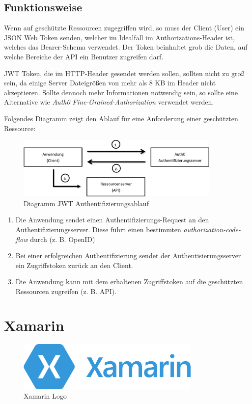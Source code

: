 \subsection{Funktionsweise}
Wenn auf geschützte Ressourcen zugegriffen wird, so muss der Client (User) ein JSON Web Token senden, 
welcher im Idealfall im Authorizations-Header ist, welches das Bearer-Schema verwendet. 
Der Token beinhaltet grob die Daten, auf welche Bereiche der API ein Benutzer zugreifen darf. 

JWT Token, die im HTTP-Header gesendet werden sollen, sollten nicht zu groß sein, da einige Server Dateigrößen von mehr als 8 KB im Header nicht akzeptieren.
Sollte dennoch mehr Informationen notwendig sein, so sollte eine Alternative wie \textit{Auth0 Fine-Grained-Authorization} verwendet werden.

Folgendes Diagramm zeigt den Ablauf für eine Anforderung einer geschützten Ressource:

\begin{figure}[h]
    \begin{center}
        \includegraphics*[width=10cm]{./pics/Ablauf-JWT-Auth.png}
        \caption[Ablauf JWT Authentifizierung]{Diagramm JWT Authentifizierungsablauf}
    \end{center}
\end{figure}
    
\begin{enumerate}
    \item Die Anwendung sendet einen Authentifizierungs-Request an den Authentifizierungsserver. Diese führt einen bestimmten \textit{authorization-code-flow} durch (z. B. OpenID)
    \item Bei einer erfolgreichen Authentifizierung sendet der Authentisierungsserver ein Zugriffstoken zurück an den Client.
    \item Die Anwendung kann mit dem erhaltenen Zugriffstoken auf die geschützten Ressourcen zugreifen (z. B. API).
\end{enumerate}

\newpage
\section{Xamarin}
\cite{XML}
\begin{figure}[h]
    \begin{center}
        \includegraphics*[width=9cm]{pics/Xamarin_logo.png}
        \caption[Xamarin Logo]{Xamarin Logo \cite{XMLlogo}}
    \end{center}
\end{figure}
